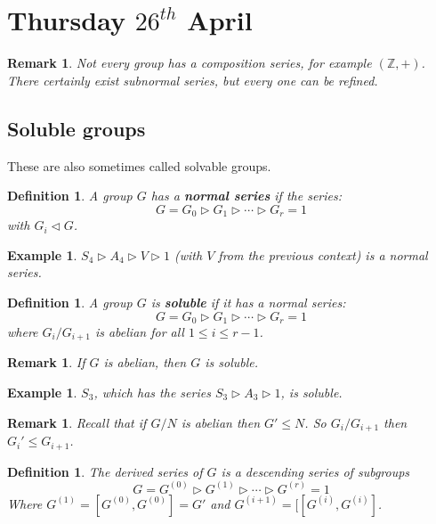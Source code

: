 \documentclass[a4paper,10pt]{article}
\newcommand{\ZZ}{\mathbb{Z}}
\newtheorem{Def}[thm]{Definition}
\newtheorem{eg}[thm]{Example}
\newtheorem{rem}[thm]{Remark}
\begin{document}
\newpage
\section{Thursday $26^{th}$ April}


\begin{rem}
Not every group has a composition series, for example $(\ZZ,+)$. There certainly exist subnormal series, but every one can be refined. 
\end{rem}



\subsection{Soluble groups}
These are also sometimes called solvable groups. 

\begin{Def}
A group $G$ has a \textbf{normal series} if the series:
\[ G = G_0 \triangleright G_1 \triangleright \cdots \triangleright G_r = 1 \]
with $G_i \triangleleft G$.
\end{Def}

\begin{eg}
$S_4 \triangleright A_4 \triangleright V \triangleright 1$ (with $V$ from the previous context) is a normal series.
\end{eg}


\begin{Def}
A group $G$ is \textbf{soluble} if it has a normal series:
\[ G = G_0 \triangleright G_1 \triangleright \cdots \triangleright G_r = 1 \]
where $G_i / G_{i+1}$ is abelian for all $1 \leq i \leq r-1$.
\end{Def}

\begin{rem}
If $G$ is abelian, then $G$ is soluble.
\end{rem}

\begin{eg}
$S_3$, which has the series $S_3 \triangleright A_3 \triangleright 1$, is soluble.
\end{eg}

\begin{rem}
Recall that if $G / N$ is abelian then $G' \leq N$. So $G_i / G_{i+1}$ then $G_i ' \leq G_{i+1}$.
\end{rem}

\begin{Def}
The derived series of $G$ is a descending series of subgroups 
\[ G = G^{(0)} \triangleright G^{(1)} \triangleright \cdots \triangleright G^{(r)} = 1 \]
Where $G^{(1)} = [G^{(0)}, G^{(0)}] = G'$ and $G^{(i+1)} = [[G^{(i)}, G^{(i)}]$. 
\end{Def}
\end{document}
